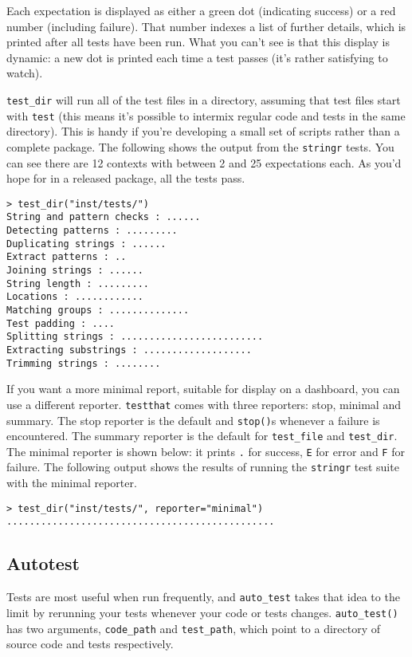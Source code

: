 Each expectation is displayed as either a green dot (indicating success)
or a red number (including failure). That number indexes a list of
further details, which is printed after all tests have been run. What
you can't see is that this display is dynamic: a new dot is printed each
time a test passes (it's rather satisfying to watch).

\texttt{test\_dir} will run all of the test files in a directory,
assuming that test files start with \texttt{test} (this means it's
possible to intermix regular code and tests in the same directory). This
is handy if you're developing a small set of scripts rather than a
complete package. The following shows the output from the
\texttt{stringr} tests. You can see there are 12 contexts with between 2
and 25 expectations each. As you'd hope for in a released package, all
the tests pass.

\begin{verbatim}
> test_dir("inst/tests/")
String and pattern checks : ......
Detecting patterns : .........
Duplicating strings : ......
Extract patterns : ..
Joining strings : ......
String length : .........
Locations : ............
Matching groups : ..............
Test padding : ....
Splitting strings : .........................
Extracting substrings : ...................
Trimming strings : ........
\end{verbatim}

If you want a more minimal report, suitable for display on a dashboard,
you can use a different reporter. \texttt{testthat} comes with three
reporters: stop, minimal and summary. The stop reporter is the default
and \texttt{stop()}s whenever a failure is encountered. The summary
reporter is the default for \texttt{test\_file} and \texttt{test\_dir}.
The minimal reporter is shown below: it prints \texttt{.} for success,
\texttt{E} for error and \texttt{F} for failure. The following output
shows the results of running the \texttt{stringr} test suite with the
minimal reporter.

\begin{verbatim}
> test_dir("inst/tests/", reporter="minimal")
...............................................
\end{verbatim}

\subsection{Autotest}

Tests are most useful when run frequently, and \texttt{auto\_test} takes
that idea to the limit by rerunning your tests whenever your code or
tests changes. \texttt{auto\_test()} has two arguments,
\texttt{code\_path} and \texttt{test\_path}, which point to a directory
of source code and tests respectively.

